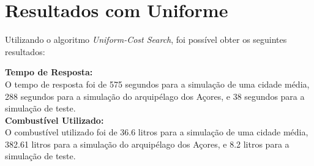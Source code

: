 \documentclass[a4paper,12pt]{scrreprt}
\begin{document}
\clearpage

\section{Resultados com Uniforme}

Utilizando o algoritmo \textit{Uniform-Cost Search}, foi possível obter os seguintes resultados:

\textbf{Tempo de Resposta:} \\
O tempo de resposta foi de 575 segundos para a simulação de uma cidade média, 288 segundos para a simulação
do arquipélago dos Açores, e 38 segundos para a simulação de teste. \\

\textbf{Combustível Utilizado:} \\
O combustível utilizado foi de 36.6 litros para a simulação de uma cidade média, 382.61 litros para a simulação
do arquipélago dos Açores, e 8.2 litros para a simulação de teste. \\

\clearpage
\end{document}
